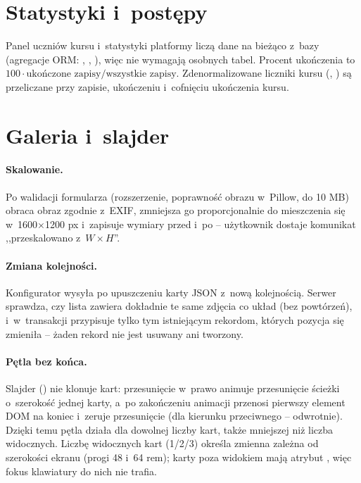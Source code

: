 \section{Statystyki i~postępy}
Panel uczniów kursu i~statystyki platformy liczą dane na bieżąco z~bazy (agregacje ORM:
, , ), więc nie wymagają osobnych tabel. Procent ukończenia to
$100 \cdot \text{ukończone zapisy} / \text{wszystkie zapisy}$. Zdenormalizowane liczniki kursu
(, ) są przeliczane przy zapisie, ukończeniu
i~cofnięciu ukończenia kursu.

\section{Galeria i~slajder}

\paragraph{Skalowanie.} Po walidacji formularza (rozszerzenie, poprawność obrazu w~Pillow,
do 10 MB)  obraca obraz zgodnie z~EXIF, zmniejsza go
proporcjonalnie do mieszczenia się w~1600$\times$1200 px i~zapisuje wymiary przed i~po --
użytkownik dostaje komunikat ,,przeskalowano z~$W\times H$''.

\paragraph{Zmiana kolejności.} Konfigurator wysyła po upuszczeniu karty JSON
 z~nową kolejnością. Serwer sprawdza, czy lista zawiera
dokładnie te same zdjęcia co układ (bez powtórzeń), i~w~transakcji przypisuje
 tylko tym istniejącym rekordom, których pozycja się zmieniła --
żaden rekord nie jest usuwany ani tworzony.

\paragraph{Pętla bez końca.} Slajder () nie klonuje kart:
przesunięcie w~prawo animuje przesunięcie ścieżki o~szerokość jednej karty, a~po
zakończeniu animacji przenosi pierwszy element DOM na koniec i~zeruje przesunięcie (dla
kierunku przeciwnego -- odwrotnie). Dzięki temu pętla działa dla dowolnej liczby kart,
także mniejszej niż liczba widocznych. Liczbę widocznych kart (1/2/3) określa zmienna
 zależna od szerokości ekranu (progi 48 i~64 rem); karty poza widokiem
mają atrybut , więc fokus klawiatury do nich nie trafia.


